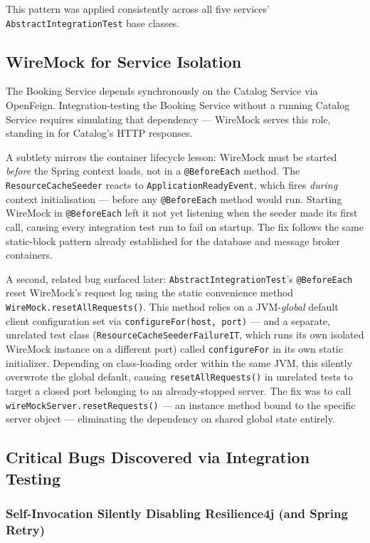 This pattern was applied consistently across all five services' \texttt{AbstractIntegrationTest} base classes.

\subsection{WireMock for Service Isolation}

The Booking Service depends synchronously on the Catalog Service via OpenFeign. Integration-testing the Booking Service without a running Catalog Service requires simulating that dependency --- WireMock serves this role, standing in for Catalog's HTTP responses.

A subtlety mirrors the container lifecycle lesson: WireMock must be started \emph{before} the Spring context loads, not in a \texttt{@BeforeEach} method. The \texttt{ResourceCacheSeeder} reacts to \texttt{ApplicationReadyEvent}, which fires \emph{during} context initialisation --- before any \texttt{@BeforeEach} method would run. Starting WireMock in \texttt{@BeforeEach} left it not yet listening when the seeder made its first call, causing every integration test run to fail on startup. The fix follows the same static-block pattern already established for the database and message broker containers.

A second, related bug surfaced later: \texttt{AbstractIntegrationTest}'s \texttt{@BeforeEach} reset WireMock's request log using the static convenience method \texttt{WireMock.resetAllRequests()}. This method relies on a JVM-\emph{global} default client configuration set via \texttt{configureFor(host, port)} --- and a separate, unrelated test class (\texttt{ResourceCacheSeederFailureIT}, which runs its own isolated WireMock instance on a different port) called \texttt{configureFor} in its own static initializer. Depending on class-loading order within the same JVM, this silently overwrote the global default, causing \texttt{resetAllRequests()} in unrelated tests to target a closed port belonging to an already-stopped server. The fix was to call \texttt{wireMockServer.resetRequests()} --- an instance method bound to the specific server object --- eliminating the dependency on shared global state entirely.

\subsection{Critical Bugs Discovered via Integration Testing}
\label{sec:bugs-found}

\subsubsection{Self-Invocation Silently Disabling Resilience4j (and Spring Retry)}

